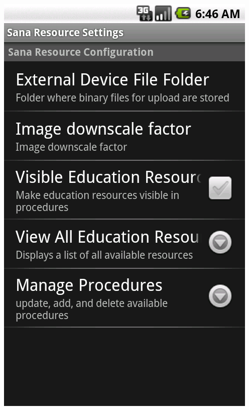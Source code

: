 \documentclass[a4paper,10pt]{article}
\begin{document}
\includegraphics[scale=0.2,keepaspectratio=true]{client_settings_resources.png}
\end{document}
